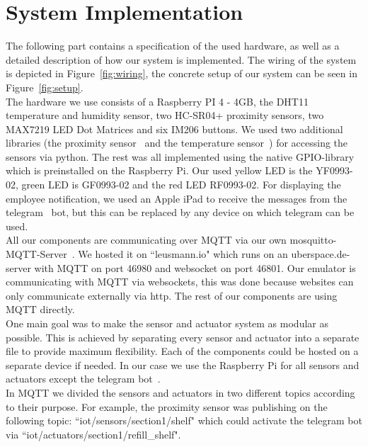 \documentclass[runningheads]{llncs}
\begin{document}
	\section{System Implementation}
	\label{sec:implementation}
	The following part contains a specification of the used hardware, as well as a detailed description of how our system is implemented. 
	The wiring of the system is depicted in Figure~\ref{fig:wiring}, the concrete setup of our system can be seen in Figure~\ref{fig:setup}.
	\\ \linebreak
	The hardware we use consists of a Raspberry PI 4 - 4GB, the DHT11 temperature and humidity sensor, two HC-SR04+ proximity sensors, two MAX7219 LED Dot Matrices and six IM206 buttons. 
	We used two additional libraries (the proximity sensor~\cite{led-matrix} and the temperature sensor~\cite{dht11}) for accessing the sensors via python.
	The rest was all implemented using the native GPIO-library which is preinstalled on the Raspberry Pi.
	Our used yellow LED is the YF0993-02, green LED is GF0993-02 and the red LED RF0993-02. For displaying the employee notification, we used an Apple iPad to receive the messages from the telegram~\cite{telegram} bot, but this can be replaced by any device on which telegram can be used. 
	\\ \linebreak
	All our components are communicating over MQTT via our own mosquitto-MQTT-Server~\cite{mosquitto}. 
	We hosted it on ``leusmann.io" which runs on an uberspace.de-server with MQTT on port 46980 and websocket on port 46801.
	Our emulator is communicating with MQTT via websockets, this was done because websites can only communicate externally via http. 
	The rest of our components are using MQTT directly. 
	\\ \linebreak
	One main goal was to make the sensor and actuator system as modular as possible. 
	This is achieved by separating every sensor and actuator into a separate file to provide maximum flexibility. 
	Each of the components could be hosted on a separate device if needed. 
	In our case we use the Raspberry Pi for all sensors and actuators except the telegram bot~\cite{telegram}. 
	\\ \linebreak
	In MQTT we divided the sensors and actuators in two different topics according to their purpose. 
	For example, the proximity sensor was publishing on the following topic: ``iot/sensors/section1/shelf" which could activate the telegram bot via  ``iot/actuators/section1/refill\_shelf". 
\end{document}
